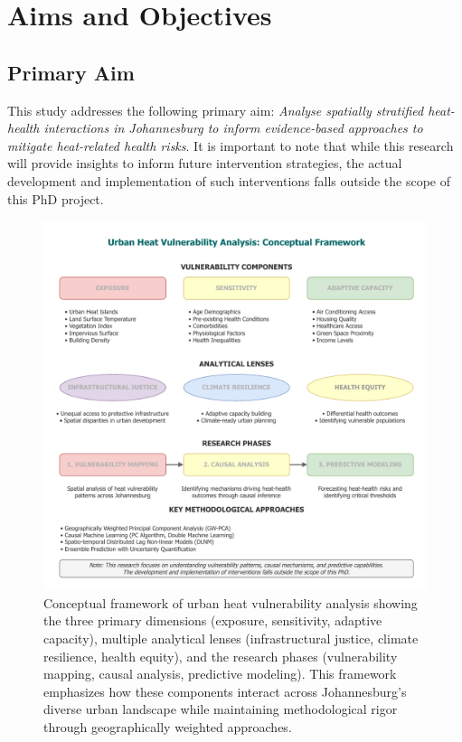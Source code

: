 \section{Aims and Objectives}
\graphicspath{{./images/}}

\subsection{Primary Aim}
This study addresses the following primary aim: \textit{Analyse spatially stratified heat-health interactions in Johannesburg to inform evidence-based approaches to mitigate heat-related health risks}. It is important to note that while this research will provide insights to inform future intervention strategies, the actual development and implementation of such interventions falls outside the scope of this PhD project.

\begin{figure}[ht]
\centering
\includegraphics[width=\textwidth]{sections/images/CPframework.drawio.pdf}
\caption{Conceptual framework of urban heat vulnerability analysis showing the three primary dimensions (exposure, sensitivity, adaptive capacity), multiple analytical lenses (infrastructural justice, climate resilience, health equity), and the research phases (vulnerability mapping, causal analysis, predictive modeling). This framework emphasizes how these components interact across Johannesburg's diverse urban landscape while maintaining methodological rigor through geographically weighted approaches.}
\label{fig:conceptual_framework}
\end{figure}

